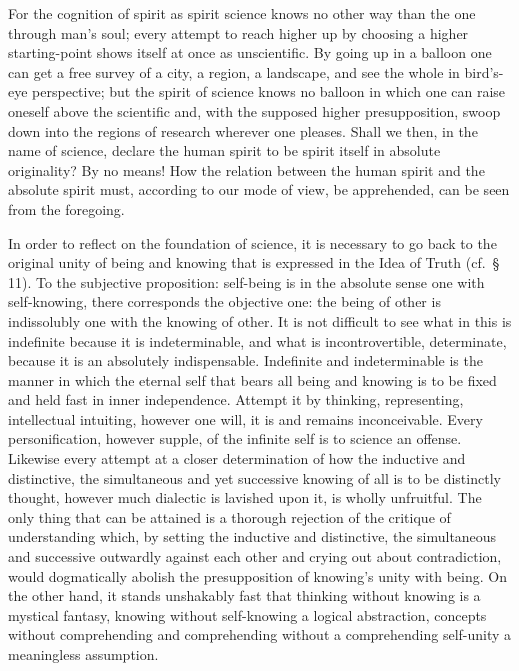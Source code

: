 \documentclass[12pt]{book}
\begin{document}
For the cognition of spirit as spirit science knows no other way than the one through man's
soul; every attempt to reach higher up by choosing a higher starting-point shows itself at
once as unscientific. By going up in a balloon one can get a free survey of a city, a
region, a landscape, and see the whole in bird's-eye perspective; but the spirit of science
knows no balloon in which one can raise oneself above the scientific and, with the supposed
higher presupposition, swoop down into the regions of research wherever one pleases. Shall
we then, in the name of science, declare the human spirit to be spirit itself in absolute
originality? By no means! How the relation between the human spirit and the absolute spirit
must, according to our mode of view, be apprehended, can be seen from the foregoing.

In order to reflect on the foundation of science, it is necessary to go back to the original
unity of being and knowing that is expressed in the Idea of Truth (cf.\ \S\,11). To the
subjective proposition: self-being is in the absolute sense one with self-knowing, there
corresponds the objective one: the being of other is indissolubly one with the knowing of
other. It is not difficult to see what in this is indefinite because it is indeterminable,
and what is incontrovertible, determinate, because it is an absolutely indispensable.
Indefinite and indeterminable is the manner in which the eternal self that bears all being
and knowing is to be fixed and held fast in inner independence. Attempt it by thinking,
representing, intellectual intuiting, however one will, it is and remains inconceivable.
Every personification, however supple, of the infinite self is to science an offense.
Likewise every attempt at a closer determination of how the inductive and distinctive, the
simultaneous and yet successive knowing of all is to be distinctly thought, however much
dialectic is lavished upon it, is wholly unfruitful. The only thing that can be attained is
a thorough rejection of the critique of understanding which, by setting the inductive and
distinctive, the simultaneous and successive outwardly against each other and crying out
about contradiction, would dogmatically abolish the presupposition of knowing's unity with
being. On the other hand, it stands unshakably fast that thinking without knowing is a
mystical fantasy, knowing without self-knowing a logical abstraction, concepts without
comprehending and comprehending without a comprehending self-unity a meaningless assumption.
\end{document}

